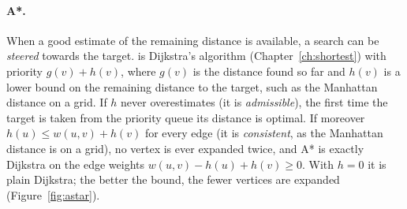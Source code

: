 
\paragraph{A*.} When a good estimate of the remaining distance is available, a search can be \emph{steered} towards the target.
 is Dijkstra's algorithm (Chapter~\ref{ch:shortest}) with priority $g(v) + h(v)$, where $g(v)$ is the distance found so
far and $h(v)$ is a lower bound on the remaining distance to the target, such as the Manhattan distance on a grid. If $h$ never
overestimates (it is \emph{admissible}), the first time the target is taken from the priority queue its distance is optimal. If
moreover $h(u) \le w(u, v) + h(v)$ for every edge (it is \emph{consistent}, as the Manhattan distance is on a grid), no vertex
is ever expanded twice, and A* is exactly Dijkstra on the edge weights $w(u, v) - h(u) + h(v) \ge 0$. With $h = 0$ it is plain
Dijkstra; the better the bound, the fewer vertices are expanded (Figure~\ref{fig:astar}).

